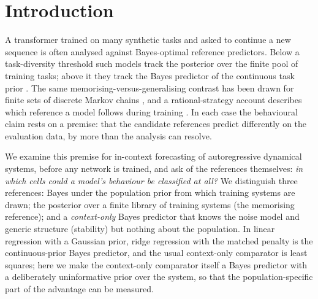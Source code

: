 \section{Introduction}
A transformer trained on many synthetic tasks and asked to continue a new sequence is often analysed against Bayes-optimal
reference predictors. Below a task-diversity threshold such models track the posterior over the finite pool of training
tasks; above it they track the Bayes predictor of the continuous task prior \citep{raventos2023,lu2025,panwar2024}. The same
memorising-versus-generalising contrast has been drawn for finite sets of discrete Markov chains \citep{gibson2026,park2025},
and a rational-strategy account describes which reference a model follows during training \citep{wurgaft2025}. In each case
the behavioural claim rests on a premise: that the candidate references predict differently on the evaluation data, by more
than the analysis can resolve.

We examine this premise for in-context forecasting of autoregressive dynamical systems, before any network is trained,
and ask of the references themselves: \emph{in which cells could a model's behaviour be classified at all?} We distinguish
three references: Bayes under the population prior from which training systems are drawn; the posterior over a finite
library of training systems (the memorising reference); and a \emph{context-only} Bayes predictor that knows the noise model
and generic structure (stability) but nothing about the population. In linear regression with a Gaussian prior, ridge
regression with the matched penalty is the continuous-prior Bayes predictor, and the usual context-only comparator is least
squares; here we make the context-only comparator itself a Bayes predictor with a deliberately uninformative prior over the
system, so that the population-specific part of the advantage can be measured.

